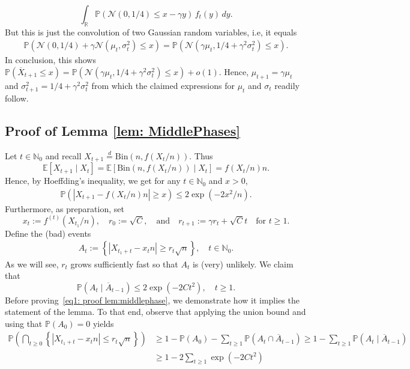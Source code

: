 \documentclass[11pt]{article}
\newcommand{\Bin}{\mathrm{Bin}}
\newcommand{\E}{\mathbb{E}}
\newcommand{\Prob}{\mathbb{P}}
\numberwithin{theorem}{section}
\begin{document}
    \[
    \int_{\mathbb{R}} \Prob(\mathcal{N}(0,1/4) \leq x-\gamma y)\, f_t(y) \, dy.
    \]
    But this is just the convolution of two Gaussian random variables, i.e, it equals
    \begin{align*}
    \Prob(\mathcal{N}(0,1/4) + \gamma\mathcal{N}(\mu_t,\sigma_t^2) \leq  x) 
    = \Prob(\mathcal{N}(\gamma\mu_t,1/4 + \gamma^2\sigma_t^2) \leq  x).
    \end{align*}
    In conclusion, this shows $
    \Prob\left(\overline{X}_{t+1}\leq x \right) = 
    \Prob(\mathcal{N}(\gamma\mu_t,1/4 + \gamma^2\sigma_t^2) \leq  x) + o(1)$.
    Hence, $\mu_{t+1} = \gamma \mu_t$ and $\sigma^2_{t+1} = 1/4 + \gamma^2\sigma_t^2$ from which the claimed expressions for $\mu_t$ and $\sigma_t$ readily follow. 

\subsection{Proof of Lemma \ref{lem: MiddlePhases}}\label{subsec: Proof of Middle Phases}
Let $t\in \mathbb{N}_0$ and recall $X_{t+1}\stackrel{d}{=}\Bin(n,f(X_t/n))$. Thus
\[
\E[X_{t+1} \mid X_t]=\E[\Bin(n,f(X_t/n)) \mid X_t]  = f (X_t/n)n.
\]
Hence, by Hoeffding's inequality, we get for any $t\in \mathbb{N}_0$ and $x>0$,
\begin{align}\label{inequ:middlephase1}
    \Prob \left(| X_{t+1} - f(X_t/n)n| \geq x \right) \leq 2\exp\left({-2x^2}/n\right).
\end{align}
Furthermore, as preparation, set
\[
    x_t := f^{(t)}(X_{t_1}/n), 
    \quad
    r_0:= \sqrt{C}, 
    \quad \text{and}\quad  
    r_{t+1} := \gamma r_t+\sqrt{C} t \quad \text{for }t\geq 1.
\]
Define the (bad) events
\begin{align*}
    A_t :=\left\{ |X_{t_1+t} - x_t n  | \geq r_t \sqrt{n} \right\},
    \quad t\in\mathbb{N}_0.
\end{align*}
As we will see, $r_t$ grows sufficiently fast so that $A_t$ is (very) unlikely. We claim that
\begin{equation}\label{eq1: proof lem:middlephase}
    \Prob(A_{t} \mid \overline{A}_{t-1}) \leq 2\exp(-2Ct^2),
    \quad t\ge 1.
\end{equation}
Before proving~\eqref{eq1: proof lem:middlephase}, we demonstrate how it  implies the statement of the lemma. To that end, observe that applying the union bound and using that $\Prob(A_0) = 0$ yields
\begin{align*}
    \Prob\left(\bigcap_{t\geq 0} \left \{ | X_{t_1+t} - x_t n | \leq r_t\sqrt{n} \right \} \right) 
    &\geq 1- \Prob(A_0) - \sum_{t \geq 1} \Prob\left(A_{t}\cap \overline{A}_{t-1} \right) \geq 1- \sum_{t \geq 1} \Prob\left(A_{t}\mid \overline{A}_{t-1} \right)\\
    &\geq 1- 2\sum_{t\geq 1} \exp(-2Ct^2)
\end{align*}
\end{document}
